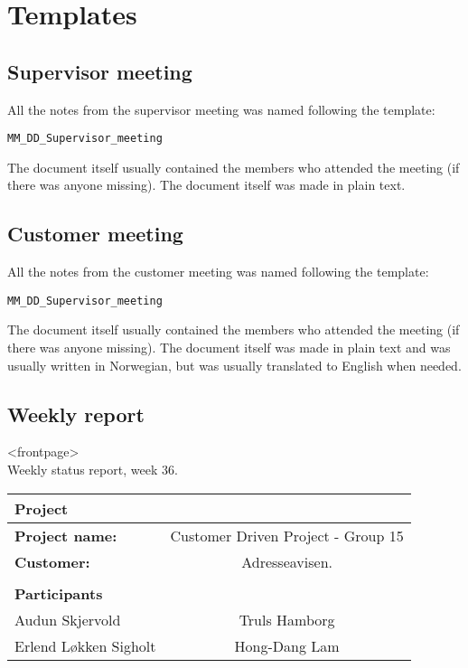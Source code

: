 \chapter{Templates}\label{appendixTemplate}
\section{Supervisor meeting}
All the notes from the supervisor meeting was named following the template: 
\begin{verbatim}
MM_DD_Supervisor_meeting
\end{verbatim}
The document itself usually contained the members who attended the meeting (if there was anyone missing).
The document itself was made in plain text.
\newpage
\section{Customer meeting}
All the notes from the customer meeting was named following the template: 
\begin{verbatim}
MM_DD_Supervisor_meeting
\end{verbatim}
The document itself usually contained the members who attended the meeting (if there was anyone missing).
The document itself was made in plain text and was usually written in Norwegian, but was usually translated to English when needed.

\section{Weekly report}

\begin{center}
<frontpage>\\
Weekly status report, week 36.
  \begin{tabular}{| l  c |}
    \hline
    Project & \\ \hline
    \textbf{Project name:} & Customer Driven Project - Group 15 \\
    \textbf{Customer:} & Adresseavisen. \\ \hline
     & \\
     \textbf{Participants} & \\ \hline
     Audun Skjervold & Truls Hamborg \\
     Erlend Løkken Sigholt & Hong-Dang Lam \\
    \hline
  \end{tabular}
  \end{center}




